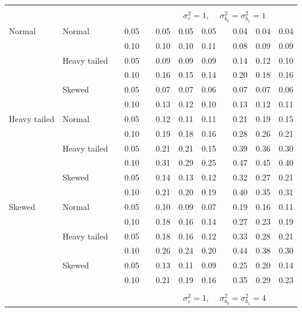 \documentclass[12pt]{article} %
\begin{document}
\begin{table}[ht]
\begin{scriptsize}
\begin{center}
\begin{tabular}{ll p{.1cm} c p{.1cm} rrr p{.1cm} rrr}
&&&&&&&&&&&\\
& && && \multicolumn{7}{c}{$\sigma_{\varepsilon}^2 = 1$, \ \ $\sigma_{b_0}^2 = \sigma_{b_1}^2 = 1$} \\ \cline{6-12}
Normal       & Normal       && 0.05 &&  0.05 & 0.05 & 0.05 && 0.04 & 0.04 & 0.04 \\ 
             &              && 0.10 &&  0.10 & 0.10 & 0.11 && 0.08 & 0.09 & 0.09 \\ 
             & Heavy tailed && 0.05 &&  0.09 & 0.09 & 0.09 && 0.14 & 0.12 & 0.10 \\ 
             &              && 0.10 &&  0.16 & 0.15 & 0.14 && 0.20 & 0.18 & 0.16 \\ 
             & Skewed       && 0.05 &&  0.07 & 0.07 & 0.06 && 0.07 & 0.07 & 0.06 \\ 
             &              && 0.10 &&  0.13 & 0.12 & 0.10 && 0.13 & 0.12 & 0.11 \\ 
Heavy tailed & Normal       && 0.05 &&  0.12 & 0.11 & 0.11 && 0.21 & 0.19 & 0.15 \\ 
             &              && 0.10 &&  0.19 & 0.18 & 0.16 && 0.28 & 0.26 & 0.21 \\ 
             & Heavy tailed && 0.05 &&  0.21 & 0.21 & 0.15 && 0.39 & 0.36 & 0.30 \\ 
             &              && 0.10 &&  0.31 & 0.29 & 0.25 && 0.47 & 0.45 & 0.40 \\ 
             & Skewed       && 0.05 &&  0.14 & 0.13 & 0.12 && 0.32 & 0.27 & 0.21 \\ 
             &              && 0.10 &&  0.21 & 0.20 & 0.19 && 0.40 & 0.35 & 0.31 \\ 
Skewed       & Normal       && 0.05 &&  0.10 & 0.09 & 0.07 && 0.19 & 0.16 & 0.11 \\ 
             &              && 0.10 &&  0.18 & 0.16 & 0.14 && 0.27 & 0.23 & 0.19 \\ 
             & Heavy tailed && 0.05 &&  0.18 & 0.16 & 0.12 && 0.33 & 0.28 & 0.21 \\ 
             &              && 0.10 &&  0.26 & 0.24 & 0.20 && 0.44 & 0.38 & 0.30 \\ 
             & Skewed       && 0.05 &&  0.13 & 0.11 & 0.09 && 0.25 & 0.20 & 0.14 \\ 
             &              && 0.10 &&  0.21 & 0.19 & 0.16 && 0.35 & 0.29 & 0.23 \\ 


&&&&&&&&&&&\\
& && && \multicolumn{7}{c}{$\sigma_{\varepsilon}^2 = 1$, \ \ $\sigma_{b_0}^2 = \sigma_{b_1}^2 = 4$} \\ \cline{6-12}

\hline
\end{tabular}
\end{center}
\end{scriptsize}
\end{table}
\end{document}
